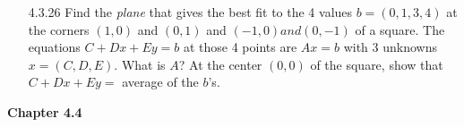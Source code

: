 \documentclass[10pt,twoside,reqno]{article}
\begin{document}
\begin{enumerate}
\vspace{3mm}
\item[4.3.26] Find the \textit{plane} that gives the best fit to the 4 values $b = (0, 1, 3, 4)$ at the corners $(1, 0)$ and $(0, 1)$ and $(-1, 0) and (0, -1)$ of a square. The equations $C + Dx + Ey = b$ at those 4 points are $Ax = b$ with 3 unknowns $x = (C, D, E)$. What is $A$? At the center $(0, 0)$ of the square, show that $C + Dx + Ey =$ average of the $b$'s.\\
\vspace{3mm}

\vspace{3mm}

\end{enumerate}
\vspace{5mm}
\textbf{Chapter 4.4}
\end{document}
